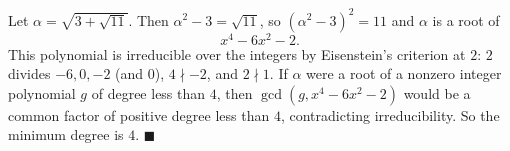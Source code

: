 Let $\alpha=\sqrt{3+\sqrt{11}}$. Then $\alpha^2-3=\sqrt{11}$, so $(\alpha^2-3)^2=11$ and $\alpha$ is a root of
\[\boxed{x^4-6x^2-2}.\]
This polynomial is irreducible over the integers by Eisenstein's criterion at $2$: $2$ divides $-6,0,-2$ (and $0$), $4\nmid-2$, and $2\nmid1$. If $\alpha$ were a root of a nonzero integer polynomial $g$ of degree less than $4$, then $\gcd(g,x^4-6x^2-2)$ would be a common factor of positive degree less than $4$, contradicting irreducibility. So the minimum degree is $4$. $\blacksquare$
